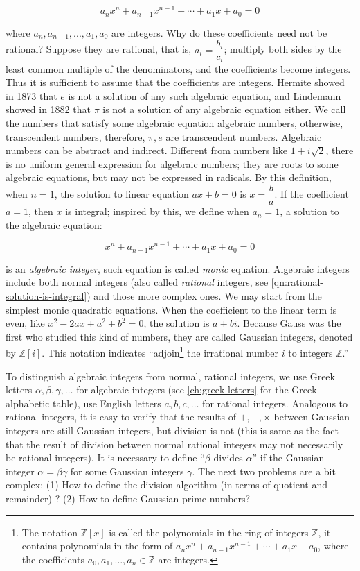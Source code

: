 \documentclass[b5paper]{article}
\begin{document}
\[
a_n x^n + a_{n-1} x^{n-1} + \dotsb + a_1 x + a_0 = 0
\]

where $a_n, a_{n-1}, ..., a_1, a_0$ are integers. Why do these coefficients need not be rational? Suppose they are rational, that is, $a_i = \dfrac{b_i}{c_i}$; multiply both sides by the least common multiple of the denominators, and the coefficients become integers. Thus it is sufficient to assume that the coefficients are integers. Hermite showed in 1873 that $e$ is not a solution of any such algebraic equation, and Lindemann showed in 1882 that $\pi$ is not a solution of any algebraic equation either. We call the numbers that satisfy some algebraic equation algebraic numbers, otherwise, transcendent numbers, therefore, $\pi, e$ are transcendent numbers. Algebraic numbers can be abstract and indirect. Different from numbers like $1 + i\sqrt{2}$, there is no uniform general expression for algebraic numbers; they are roots to some algebraic equations, but may not be expressed in radicals. By this definition, when $n = 1$, the solution to linear equation $ax + b = 0$ is $x = \dfrac{b}{a}$. If the coefficient $a = 1$, then $x$ is integral; inspired by this, we define when $a_n = 1$, a solution to the algebraic equation:

\[
x^n + a_{n-1} x^{n-1} + \dotsb + a_1 x + a_0 = 0
\]

  
is an \emph{algebraic integer}, such equation is called \emph{monic} equation. Algebraic integers include both normal integers (also called \emph{rational} integers, see \cref{qn:rational-solution-is-integral}) and those more complex ones. We may start from the simplest monic quadratic equations. When the coefficient to the linear term is even, like $x^2 - 2ax + a^2 + b^2 = 0$, the solution is $a \pm bi$. Because Gauss was the first who studied this kind of numbers, they are called Gaussian integers, denoted by $\mathbb{Z}[i]$. This notation indicates \enquote{adjoin\footnote{The notation $\mathbb{Z}[x]$ is called the polynomials in the ring of integers $\mathbb{Z}$, it contains polynomials in the form of $a_n x^n + a_{n-1} x^{n-1} + \dotsb + a_1 x + a_0$, where the coefficients $a_0, a_1, \dotsc, a_n \in \mathbb{Z}$ are integers.} the irrational number $i$ to integers $\mathbb{Z}$.}

To distinguish algebraic integers from normal, rational integers, we use Greek letters $\alpha, \beta, \gamma, \dotsc$ for algebraic integers (see \cref{ch:greek-letters} for the Greek alphabetic table), use English letters $a, b, c, \dotsc$ for rational integers. Analogous to rational integers, it is easy to verify that the results of $+, -, \times$ between Gaussian integers are still Gaussian integers, but division is not (this is same as the fact that the result of division between normal rational integers may not necessarily be rational integers). It is necessary to define \enquote{$\beta$ divides $\alpha$} if the Gaussian integer $\alpha = \beta\gamma$ for some Gaussian integers $\gamma$. The next two problems are a bit complex: (1) How to define the division algorithm (in terms of quotient and remainder) ? (2) How to define Gaussian prime numbers?
\end{document}
